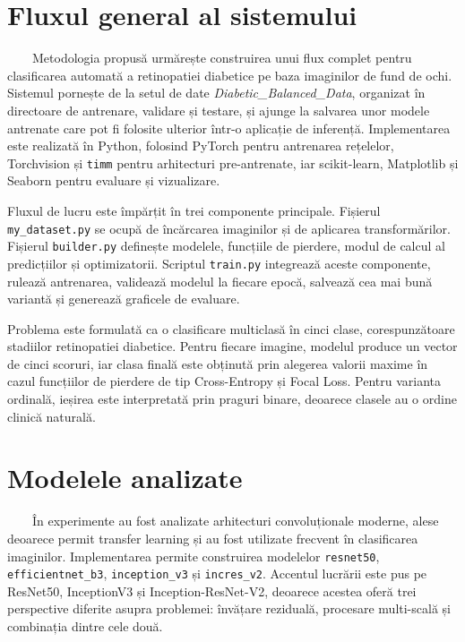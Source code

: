 \documentclass[12pt, a4paper, oneside, romanian]{teza-upb}
\begin{document}
\section{Fluxul general al sistemului}

\ \ \ \ Metodologia propusă urmărește construirea unui flux complet pentru clasificarea automată a retinopatiei diabetice pe baza imaginilor de fund de ochi. Sistemul pornește de la setul de date \textit{Diabetic\_Balanced\_Data}, organizat în directoare de antrenare, validare și testare, și ajunge la salvarea unor modele antrenate care pot fi folosite ulterior într-o aplicație de inferență. Implementarea este realizată în Python, folosind PyTorch pentru antrenarea rețelelor, Torchvision și \texttt{timm} pentru arhitecturi pre-antrenate, iar scikit-learn, Matplotlib și Seaborn pentru evaluare și vizualizare.
\bigskip

Fluxul de lucru este împărțit în trei componente principale. Fișierul \texttt{my\_dataset.py} se ocupă de încărcarea imaginilor și de aplicarea transformărilor. Fișierul \texttt{builder.py} definește modelele, funcțiile de pierdere, modul de calcul al predicțiilor și optimizatorii. Scriptul \texttt{train.py} integrează aceste componente, rulează antrenarea, validează modelul la fiecare epocă, salvează cea mai bună variantă și generează graficele de evaluare.
\bigskip

Problema este formulată ca o clasificare multiclasă în cinci clase, corespunzătoare stadiilor retinopatiei diabetice. Pentru fiecare imagine, modelul produce un vector de cinci scoruri, iar clasa finală este obținută prin alegerea valorii maxime în cazul funcțiilor de pierdere de tip Cross-Entropy și Focal Loss. Pentru varianta ordinală, ieșirea este interpretată prin praguri binare, deoarece clasele au o ordine clinică naturală.

\section{Modelele analizate}

\ \ \ \ În experimente au fost analizate arhitecturi convoluționale moderne, alese deoarece permit transfer learning și au fost utilizate frecvent în clasificarea imaginilor. Implementarea permite construirea modelelor \texttt{resnet50}, \texttt{efficientnet\_b3}, \texttt{inception\_v3} și \texttt{incres\_v2}. Accentul lucrării este pus pe ResNet50, InceptionV3 și Inception-ResNet-V2, deoarece acestea oferă trei perspective diferite asupra problemei: învățare reziduală, procesare multi-scală și combinația dintre cele două.
\bigskip
\end{document}
